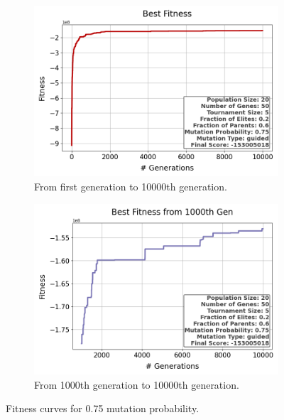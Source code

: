 \documentclass{assignment}
\begin{document}
\begin{figure}[H]
    \begin{subfigure}{0.5\textwidth}
        \includegraphics[width=\textwidth]{figures/best_fitness_output_20_50_5_0.2_0.6_0.75_guided.png}
        \caption{From first generation to 10000th generation.}
    \end{subfigure}\hfill
    \begin{subfigure}{0.5\textwidth}
        \includegraphics[width=\textwidth]{figures/best_fitness_1000_output_20_50_5_0.2_0.6_0.75_guided.png}
        \caption{From 1000th generation to 10000th generation.}
    \end{subfigure}
    \caption{Fitness curves for 0.75 mutation probability.}
\label{fig:0.75mutation}
\end{figure}
\end{document}
